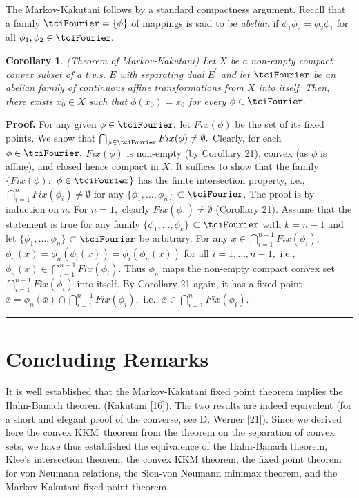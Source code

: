 \documentclass{article}
\newtheorem{corollary}[theorem]{Corollary}
\newenvironment{proof}[1][Proof]{\noindent\textbf{#1.} }{\ \rule{0.5em}{0.5em}}
\begin{document}
The Markov-Kakutani follows by a standard compactness argument. Recall that
a family $\mathcal{\tciFourier }=\{\phi \}$ of mappings is said to be 
\textit{abelian} if $\phi _{1}\phi _{2}=\phi _{2}\phi _{1}$ for all $\phi
_{1},\phi _{2}\in \tciFourier .$

\begin{corollary}
(Theorem of Markov-Kakutani) Let $X$ be a non-empty compact convex subset of
a t.v.s. $E$ with separating dual $E^{\prime }$ and let $\tciFourier $ be an
abelian family of continuous affine transformations from $X$ into itself$.$
Then, there exists $x_{0}\in X$ such that $\phi (x_{0})=x_{0}$ for every $%
\phi \in \tciFourier .$
\end{corollary}

\begin{proof}
For any given $\phi \in \tciFourier ,$ let $Fix(\phi )$ be the set of its
fixed points. We show that $\bigcap_{\phi \in \tciFourier }Fix(\phi )\neq
\emptyset .$ Clearly, for each $\phi \in \tciFourier ,$ $Fix(\phi )$ is
non-empty (by Corollary 21), convex (as $\phi $ is affine), and closed hence
compact in $X.$ It suffices to show that the family $\{Fix(\phi ):$ $\phi
\in \tciFourier \}$ has the finite intersection property, i.e., $%
\bigcap_{i=1}^{n}Fix(\phi _{i})\neq \emptyset $ for any $\{\phi _{1},\ldots
,\phi _{n}\}$ $\subset \tciFourier $. The proof is by induction on $n.$ For $%
n=1,$ clearly $Fix(\phi _{1})\neq \emptyset $ (Corollary 21). Assume that
the statement is true for any family $\{\phi _{1},\ldots ,\phi _{k}\}$ $%
\subset \tciFourier $ with $k=n-1$ and let $\{\phi _{1},\ldots ,\phi _{n}\}$ 
$\subset \tciFourier $ be arbitrary. For any $x\in
\bigcap_{i=1}^{n-1}Fix(\phi _{i}),$ $\phi _{n}(x)=\phi _{n}(\phi
_{i}(x))=\phi _{i}(\phi _{n}(x))$ for all $i=1,\ldots ,n-1,$ i.e., $\phi
_{n}(x)\in \bigcap_{i=1}^{n-1}Fix(\phi _{i}).$ Thus $\phi _{n}$ maps the
non-empty compact convex set $\bigcap_{i=1}^{n-1}Fix(\phi _{i})$ into
itself. By Corollary 21 again, it has a fixed point $\bar{x}=\phi _{n}(\bar{x%
})\cap \bigcap_{i=1}^{n-1}Fix(\phi _{i}),$ i.e., $\bar{x}\in
\bigcap_{i=1}^{n}Fix(\phi _{i}).$
\end{proof}

\section{Concluding Remarks}

It is well established that the Markov-Kakutani fixed point theorem implies
the Hahn-Banach theorem (Kakutani [16]). The two results are indeed
equivalent (for a short and elegant proof of the converse, see D. Werner
[21]). Since we derived here the convex KKM\ theorem from the theorem on the
separation of convex sets, we have thus established the equivalence of the
Hahn-Banach theorem, Klee's intersection theorem, the convex KKM theorem,
the fixed point theorem for von Neumann relations, the Sion-von Neumann
minimax theorem, and the Markov-Kakutani fixed point theorem.
\end{document}
